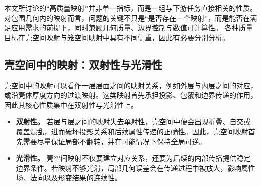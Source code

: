 本文所讨论的“高质量映射”并非单一指标，而是一组与下游任务直接相关的性质。对包围几何内的映射而言，问题的关键不只是“是否存在一个映射”，而是能否在满足应用需求的前提下，同时兼顾几何质量、边界控制与数值可计算性。
%
各种质量目标在壳空间映射与笼空间映射中具有不同侧重，因此有必要分别分析。

\subsection{壳空间中的映射：双射性与光滑性}

壳空间中的映射可以看作一层层面之间的映射关系，例如外层与内层之间的对应，或沿壳体厚度方向的过渡映射。这类映射首先承担投影、包覆和边界传递的作用，因此其核心性质集中在双射性与光滑性上。

\begin{itemize}
  \item \textbf{双射性。} 若层与层之间的映射失去单射性，壳空间中便会出现折叠、自交或覆盖混乱，进而破坏投影关系和后续属性传递的正确性。因此，壳空间映射首先需要尽量保证局部不翻转，并在可能情况下保持全局可逆。
  \item \textbf{光滑性。} 壳空间映射不仅要建立对应关系，还要为后续的内部传播提供稳定边界条件。若映射不够光滑，局部几何误差会在传递过程中被放大，影响属性场、法向以及形变结果的连续性。
\end{itemize}

